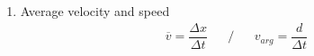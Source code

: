 \documentclass[12pt,a4paper]{report}
\begin{document}
{\begin{center}
\begin{enumerate}
\begin{itemize}
                \begin{equation} \label{eu_eqn}
					\Delta x = x - x_{0}   		
         		\end{equation}
				\begin{center}
				$\Delta x$ is displacement, $x$ is the final position, $x_{0}$ is the initial position.
				\\
				Displacement is the difference between the final and initial positions.
				\end{center}				         		
         		
                
            \end{itemize}
            
   		\item Average velocity and speed
   			\begin{align*}
   				\overline{v} = \dfrac{\Delta x}{\Delta t} && / && v_{arg} = \dfrac{d}{\Delta t}
   			\end{align*}
   				
   		
            
    \end{enumerate}
    
\end{center}




}
\end{document}
